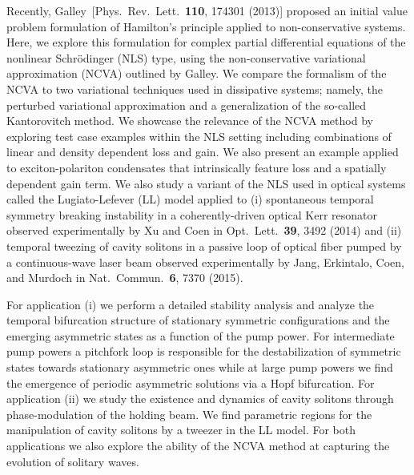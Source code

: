 Recently, Galley~[Phys.~Rev.~Lett.~{\bf 110}, 174301 (2013)] proposed an initial value problem formulation of Hamilton's principle applied to non-conservative systems.  Here, we explore this formulation for complex partial differential equations of the nonlinear Schr\"{o}dinger (NLS) type, using the non-conservative variational approximation (NCVA) outlined by Galley.  We compare the formalism of the NCVA to two variational techniques used in dissipative systems; namely, the perturbed variational approximation and a generalization of the so-called Kantorovitch method.  We showcase the relevance of the NCVA method by exploring test case examples within the NLS setting including combinations of linear and density dependent loss and gain.  We also present an example applied to exciton-polariton condensates that intrinsically feature loss and a spatially dependent gain term.  We also study a variant of the NLS used in optical systems called the Lugiato-Lefever (LL) model applied to (i) spontaneous temporal symmetry breaking instability in a coherently-driven optical Kerr resonator observed experimentally by Xu and Coen in Opt.~Lett.~{\bf 39}, 3492 (2014) and (ii) temporal tweezing of cavity solitons in a passive loop of optical fiber pumped by a continuous-wave laser beam observed experimentally by Jang, Erkintalo, Coen, and Murdoch in Nat.~Commun.~{\bf 6}, 7370 (2015).  

For application (i) we perform a detailed stability analysis and analyze the temporal bifurcation structure of stationary symmetric configurations and the emerging asymmetric states as a function of the pump power. For intermediate pump powers a pitchfork loop is responsible for the destabilization of symmetric states towards stationary asymmetric ones while at large pump powers we find the emergence of periodic asymmetric solutions via a Hopf bifurcation. 
For application (ii) we study the existence and dynamics of cavity solitons through phase-modulation of the holding beam.  We find parametric regions for the manipulation of cavity solitons by a tweezer in the LL model.  For both applications we also explore the ability of the NCVA method at capturing the evolution of solitary waves.

